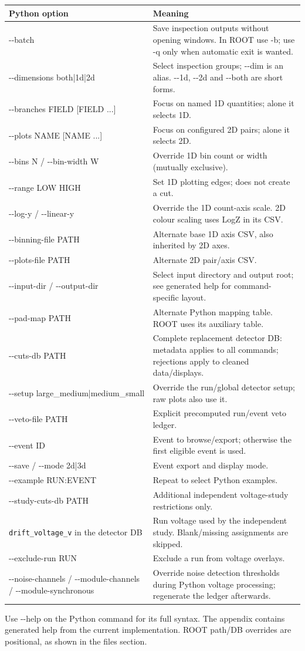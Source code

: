 \documentclass[11pt,a4paper]{article}
\begin{document}
\begin{longtable}{p{.35\linewidth}p{.57\linewidth}}
\toprule Python option & Meaning \\\midrule
-{}-batch & Save inspection outputs without opening windows. In ROOT use -b; use -q only when automatic exit is wanted.\\
-{}-dimensions both|1d|2d & Select inspection groups; -{}-dim is an alias. -{}-1d, -{}-2d and -{}-both are short forms.\\
-{}-branches FIELD [FIELD ...] & Focus on named 1D quantities; alone it selects 1D.\\
-{}-plots NAME [NAME ...] & Focus on configured 2D pairs; alone it selects 2D.\\
-{}-bins N / -{}-bin-width W & Override 1D bin count or width (mutually exclusive).\\
-{}-range LOW HIGH & Set 1D plotting edges; does not create a cut.\\
-{}-log-y / -{}-linear-y & Override the 1D count-axis scale. 2D colour scaling uses LogZ in its CSV.\\
-{}-binning-file PATH & Alternate base 1D axis CSV, also inherited by 2D axes.\\
-{}-plots-file PATH & Alternate 2D pair/axis CSV.\\
-{}-input-dir / -{}-output-dir & Select input directory and output root; see generated help for command-specific layout.\\
-{}-pad-map PATH & Alternate Python mapping table. ROOT uses its auxiliary table.\\
-{}-cuts-db PATH & Complete replacement detector DB: metadata applies to all commands; rejections apply to cleaned data/displays.\\
-{}-setup large\_medium|medium\_small & Override the run/global detector setup; raw plots also use it.\\
-{}-veto-file PATH & Explicit precomputed run/event veto ledger.\\
-{}-event ID & Event to browse/export; otherwise the first eligible event is used.\\
-{}-save / -{}-mode 2d|3d & Event export and display mode.\\
-{}-example RUN:EVENT & Repeat to select Python examples.\\
-{}-study-cuts-db PATH & Additional independent voltage-study restrictions only.\\
\texttt{drift\_voltage\_v} in the detector DB & Run voltage used by the independent study. Blank/missing assignments are skipped.\\
-{}-exclude-run RUN & Exclude a run from voltage overlays.\\
-{}-noise-channels / -{}-module-channels / -{}-module-synchronous & Override noise detection thresholds during Python voltage processing; regenerate the ledger afterwards.\\
\bottomrule
\end{longtable}
Use -{}-help on the Python command for its full syntax. The appendix contains generated
help from the current implementation. ROOT path/DB overrides are positional, as
shown in the files section.
\end{document}
